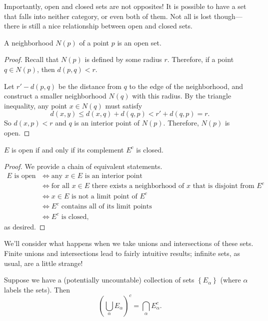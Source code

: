 \documentclass[../m131main.tex]{subfiles}
\begin{document}
Importantly, open and closed sets are not opposites!
It is possible to have a set that falls into neither category, or even both of them.
Not all is lost though---there is still a nice relationship between open and closed sets.

\begin{lemma}
    A neighborhood $N(p)$ of a point $p$ is an open set.
\end{lemma}

\begin{proof}
    Recall that $N(p)$ is defined by some radius $r$.
    Therefore, if a point $q \in N(p)$, then $d(p,q) < r$.

    Let $r' - d(p,q)$ be the distance from $q$ to the edge of the neighborhood, and construct a smaller neighborhood $N(q)$ with this radius.
    By the triangle inequality, any point $x \in N(q)$ must satisfy
    \[ d(x,y) \leq d(x,q) + d(q,p) < r' + d(q,p) = r. \]
    So $d(x,p) < r$ and $q$ is an interior point of $N(p)$.
    Therefore, $N(p)$ is open.
\end{proof}

\begin{theorem}
    $E$ is open if and only if its complement $E^c$ is closed.
\end{theorem}

\begin{proof}
    We provide a chain of equivalent statements.
    \begin{align*}
        \text{$E$ is open} &\iff \text{any $x \in E$ is an interior point} \\
        &\iff \text{for all $x \in E$ there exists a neighborhood of $x$ that is disjoint from $E^c$} \\
        &\iff \text{$x \in E$ is not a limit point of $E^c$} \\
        &\iff \text{$E^c$ contains all of its limit points} \\
        &\iff \text{$E^c$ is closed},
    \end{align*}
    as desired.
\end{proof}

We'll consider what happens when we take unions and intersections of these sets.
Finite unions and intersections lead to fairly intuitive results; infinite sets, as usual, are a little strange!

\begin{lemma}
    Suppose we have a (potentially uncountable) collection of sets $\left\{ E_\alpha \right\}$ (where $\alpha$ labels the sets).
    Then
    \[ \left( \bigcup_\alpha E_\alpha \right)^c = \bigcap_\alpha E_\alpha^c. \]
\end{lemma}
\end{document}
